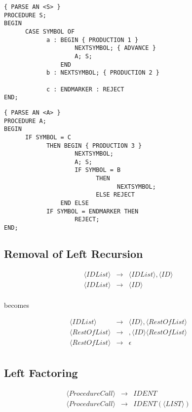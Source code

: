 \documentclass[a4paper,12pt]{article}
\newcommand{\nonterminal}[1]{\langle #1 \rangle}
\begin{document}
\begin{verbatim}
{ PARSE AN <S> }
PROCEDURE S;
BEGIN
      CASE SYMBOL OF
            a : BEGIN { PRODUCTION 1 }
                    NEXTSYMBOL; { ADVANCE }
                    A; S;
                END
            b : NEXTSYMBOL; { PRODUCTION 2 }

            c : ENDMARKER : REJECT
END;
\end{verbatim}

\begin{verbatim}
{ PARSE AN <A> }
PROCEDURE A;
BEGIN
      IF SYMBOL = C
            THEN BEGIN { PRODUCTION 3 }
                    NEXTSYMBOL;
                    A; S;
                    IF SYMBOL = B
                          THEN
                                NEXTSYMBOL;
                          ELSE REJECT
                END ELSE
            IF SYMBOL = ENDMARKER THEN
                    REJECT;
END;
\end{verbatim}

\subsection*{Removal of Left Recursion}

\begin{eqnarray*}
\nonterminal{ID List}	&	\to	&	\nonterminal{ID List}, \nonterminal{ID}	\\
\nonterminal{ID List}	&	\to	&	\nonterminal{ID}									\\
\end{eqnarray*}

becomes

\begin{eqnarray*}
\nonterminal{ID List}		&	\to	&	\nonterminal{ID}, \nonterminal{Rest Of List}	\\
\nonterminal{Rest Of List}	&	\to	&	, \nonterminal{ID} \nonterminal{Rest Of List}\\
\nonterminal{Rest Of List}	&	\to	&	\epsilon													\\
\end{eqnarray*}

\subsection*{Left Factoring}

\begin{eqnarray*}
\nonterminal{Procedure Call}	&	\to	&	IDENT									\\
\nonterminal{Procedure Call}	&	\to	&	IDENT(\nonterminal{LIST})		\\
\end{eqnarray*}
\end{document}
